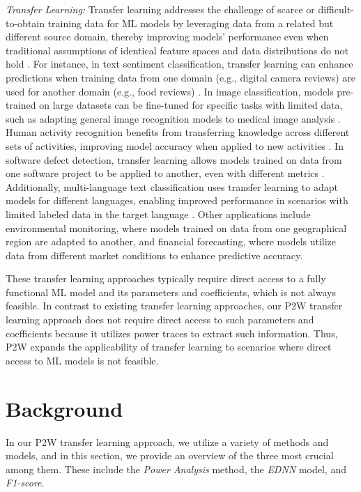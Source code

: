 \documentclass[letterpaper]{article}
\begin{document}
\emph{Transfer Learning:}
Transfer learning addresses the challenge of scarce or difficult-to-obtain training data for ML models by leveraging data from a related but different source domain, thereby improving models' performance even when traditional assumptions of identical feature spaces and data distributions do not hold \cite{Weiss2016}. For instance, in text sentiment classification, transfer learning can enhance predictions when training data from one domain (e.g., digital camera reviews) are used for another domain (e.g., food reviews) \cite{5288526}. In image classification, models pre-trained on large datasets can be fine-tuned for specific tasks with limited data, such as adapting general image recognition models to medical image analysis \cite{10.1109/CVPR.2011.5995702, Zhu_Chen_Lu_Pan_Xue_Yu_Yang_2011}. Human activity recognition benefits from transferring knowledge across different sets of activities, improving model accuracy when applied to new activities \cite{10.5555/3104482.3104533}. In software defect detection, transfer learning allows models trained on data from one software project to be applied to another, even with different metrics \cite{10.1145/2786805.2786814}. Additionally, multi-language text classification uses transfer learning to adapt models for different languages, enabling improved performance in scenarios with limited labeled data in the target language \cite{JMLR:v20:13-580, Zhou_Pan_Tsang_Yan_2014}. Other applications include environmental monitoring, where models trained on data from one geographical region are adapted to another, and financial forecasting, where models utilize data from different market conditions to enhance predictive accuracy.

These transfer learning approaches typically require direct access to a fully functional ML model and its parameters and coefficients, which is not always feasible. In contrast to existing transfer learning approaches, our P2W transfer learning approach does not require direct access to such parameters and coefficients because it utilizes power traces to extract such information. Thus, P2W expands the applicability of transfer learning to scenarios where direct access to ML models is not feasible.
 

\section{Background}
\label{sec:Background}
In our P2W transfer learning approach, we utilize a variety of methods and models, and in this section, we provide an overview of the three most crucial among them. These include the \emph{Power Analysis} method, the \emph{EDNN} model, and \emph{F1-score}.
\end{document}
